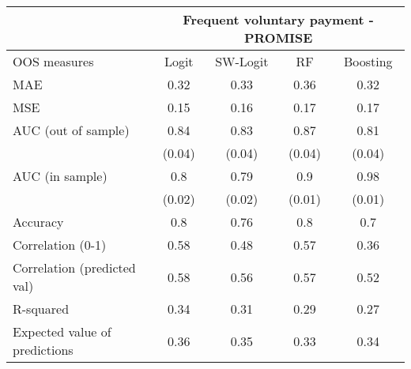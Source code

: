 \begin{tabular}{lcccc}
\toprule
      & \multicolumn{4}{c}{Frequent voluntary payment - PROMISE} \\
\midrule
\midrule
OOS measures & Logit & SW-Logit & RF    & Boosting \\
\midrule
\midrule
MAE   & 0.32  & 0.33  & 0.36  & 0.32 \\
MSE   & 0.15  & 0.16  & 0.17  & 0.17 \\
AUC (out of sample) & 0.84  & 0.83  & 0.87  & 0.81 \\
      & (0.04) & (0.04) & (0.04) & (0.04) \\
AUC (in sample) & 0.8   & 0.79  & 0.9   & 0.98 \\
      & (0.02) & (0.02) & (0.01) & (0.01) \\
Accuracy & 0.8   & 0.76  & 0.8   & 0.7 \\
Correlation (0-1) & 0.58  & 0.48  & 0.57  & 0.36 \\
Correlation (predicted val) & 0.58  & 0.56  & 0.57  & 0.52 \\
R-squared  & 0.34  & 0.31  & 0.29  & 0.27 \\
Expected value of predictions & 0.36  & 0.35  & 0.33  & 0.34 \\
\bottomrule
\bottomrule
\end{tabular}%
